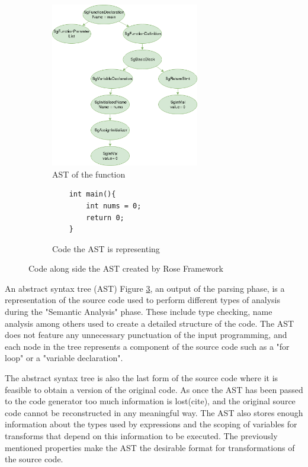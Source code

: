\documentclass[bsc,frontabs,singlespacing,parskip,deptreport]{infthesis}
\begin{document}
\begin{figure}[H]
    \begin{subfigure}[b]{0.5\textwidth}
        \centering
        \includegraphics[height=7.2cm]{images/ast-example.png}
        \caption{AST of the function}
        \label{fig:ast-example-AST}
    \end{subfigure}
    \hfill
    \begin{subfigure}[b]{0.5\textwidth}
        \centering
        \begin{verbatim}
    int main(){
        int nums = 0;
        return 0;
    }
        \end{verbatim}
        \caption{Code the AST is representing}
        \label{fig:ast-example-code}
    \end{subfigure}
    \vspace{-0.5cm}
    \caption{Code along side the AST created by Rose Framework }
    \label{fig:ast-example}
\end{figure}

An abstract syntax tree (AST) Figure \ref{fig:ast-example}, an output of the parsing phase, is a representation of the source code used to perform different types of analysis during the "Semantic Analysis" phase. These include type checking, name analysis among others used to create a detailed structure of the code. The AST does not feature any unnecessary punctuation of the input programming, and each node in the tree represents a component of the source code such as a "for loop" or a "variable declaration".


The abstract syntax tree is also the last form of the source code where it is feasible to obtain a version of the original code. As once the AST has been passed to the code generator too much information is lost(cite), and the original source code cannot be reconstructed in any meaningful way. The AST also stores enough information about the types used by expressions and the scoping of variables for transforms that depend on this information to be executed. The previously mentioned properties make the AST the desirable format for transformations of the source code. 
\end{document}
